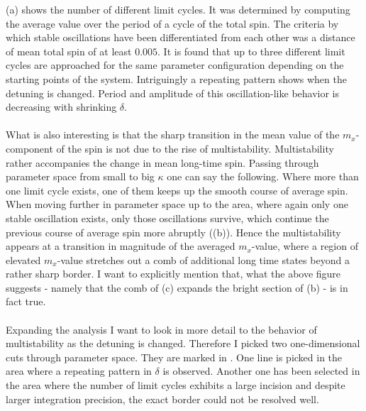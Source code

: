 (a) shows the number of different limit cycles. It was determined by computing the average value over the period of a cycle of the total spin. The criteria by which stable oscillations have been differentiated from each other was a distance of mean total spin of at least $0.005$. It is found that up to three different limit cycles are approached for the same parameter configuration depending on the starting points of the system. Intriguingly a repeating pattern shows when the detuning is changed. Period and amplitude of this oscillation-like behavior is decreasing with shrinking $\delta$. \\\\What is also interesting is that the sharp transition in the mean value of the $m_x$-component of the spin is not due to the rise of multistability. Multistability rather accompanies the change in mean long-time spin. Passing through parameter space from small to big $\kappa$ one can say the following. Where more than one limit cycle exists, one of them keeps up the smooth course of average spin. When moving further in parameter space up to the area, where again only one stable oscillation exists, only those oscillations survive, which continue the previous course of average spin more abruptly ((b)). Hence the multistability appears at a transition in magnitude of the averaged $m_x$-value, where a region of elevated $m_x$-value stretches out a comb of additional long time states beyond a rather sharp border. I want to explicitly mention that, what the above figure suggests - namely that the comb of (c) expands the bright section of (b) - is in  fact true.\\\\
Expanding the analysis I want to look in more detail to the behavior of multistability as the detuning is changed. Therefore I picked two one-dimensional cuts through parameter space. They are marked in . One line is picked in the area where a repeating pattern in $\delta$ is observed. Another one has been selected in the area where the number of limit cycles exhibits a large incision and despite larger integration precision, the exact border could not be resolved well. \\\\
